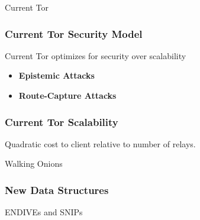 \documentclass[hyperref={pdfpagelabels=true},table,dvipsnames,14pt,aspectratio=169]{beamer}
\begin{document}
\begin{frame}
  \centering
  \huge
  Current Tor
\end{frame}

\begin{frame}
\frametitle{Current Tor Security Model}

Current Tor optimizes for security over scalability

  \begin{itemize}
    \item \textbf{Epistemic Attacks}
    \item \textbf{Route-Capture Attacks}
  \end{itemize}

\end{frame}

\begin{frame}
\frametitle{Current Tor Scalability}

Quadratic cost to client relative to number of relays.

\end{frame}

\begin{frame}
  \centering
  \huge
  Walking Onions
\end{frame}

\begin{frame}
\frametitle{New Data Structures}
ENDIVEs and SNIPs
\end{frame}
\end{document}
